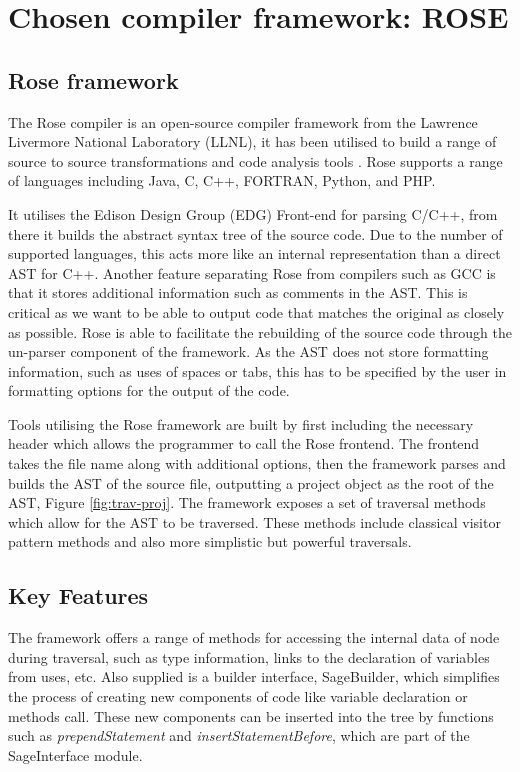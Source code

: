 \documentclass[bsc,frontabs,singlespacing,twoside,parskip,deptreport]{infthesis}
\begin{document}
\section{Chosen compiler framework: ROSE}\label{sec:chose-rose}
\subsection{Rose framework}
The Rose compiler \cite{ROSE} is an open-source compiler framework from the Lawrence Livermore National Laboratory (LLNL), it has been utilised to build a range of source to source transformations and code analysis tools \cite{ROSE_TOOLS}. Rose supports a range of languages including Java, C, C++, FORTRAN, Python, and PHP. 

It utilises the Edison Design Group (EDG) Front-end \cite{EDG} for parsing C/C++, from there it builds the abstract syntax tree of the source code. Due to the number of supported languages, this acts more like an internal representation than a direct AST for C++. Another feature separating Rose from compilers such as GCC is that it stores additional information such as comments in the AST. This is critical as we want to be able to output code that matches the original as closely as possible. Rose is able to facilitate the rebuilding of the source code through the un-parser component of the framework. As the AST does not store formatting information, such as uses of spaces or tabs, this has to be specified by the user in formatting options for the output of the code.

Tools utilising the Rose framework are built by first including the necessary header which allows the programmer to call the Rose frontend. The frontend takes the file name along with additional options, then the framework parses and builds the AST of the source file, outputting a project object as the root of the AST, Figure \ref{fig:trav-proj}. The framework exposes a set of traversal methods which allow for the AST to be traversed. These methods include classical visitor pattern methods and also more simplistic but powerful traversals. 

\subsection{Key Features}

The framework offers a range of methods for accessing the internal data of node during traversal, such as type information, links to the declaration of variables from uses, etc. Also supplied is a builder interface, SageBuilder, which simplifies the process of creating new components of code like variable declaration or methods call. These new components can be inserted into the tree by functions such as \textit{prependStatement} and \textit{insertStatementBefore}, which are part of the SageInterface module. 
\end{document}
